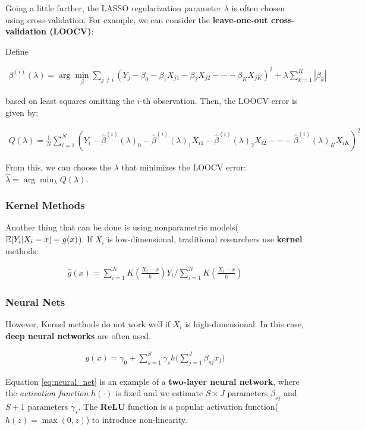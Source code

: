 Going a little further, the LASSO regularization parameter $\lambda$ is often chosen using cross-validation. For example, we can consider the \textbf{leave-one-out cross-validation (LOOCV)}:

Define 

\begin{align}
    \beta^{(i)}(\lambda) = \arg\min_{\beta} \sum_{j\neq i} (Y_j - \beta_0 - \beta_1 X_{j1} - \beta_2 X_{j2} - \cdots - \beta_K X_{jK})^2 + \lambda \sum_{k=1}^K |\beta_k|
\end{align}

based on least squares omitting the $i$-th observation. Then, the LOOCV error is given by:

\begin{align}
    Q(\lambda) = \frac{1}{N} \sum_{i=1}^N (Y_i - \hat{\beta}^{(i)}(\lambda)_0 - \hat{\beta}^{(i)}(\lambda)_1 X_{i1} - \hat{\beta}^{(i)}(\lambda)_2 X_{i2} - \cdots - \hat{\beta}^{(i)}(\lambda)_K X_{iK})^2
\end{align}

From this, we can choose the $\lambda$ that minimizes the LOOCV error: $\hat{\lambda} = \arg\min_\lambda Q(\lambda)$.

\subsubsection{Kernel Methods}

Another thing that can be done is using nonparametric models(${\mathbb{E}}[Y_i|X_i=x] = g(x)$). If $X_i$ is low-dimensional, traditional researchers use \textbf{kernel} methods:

\begin{align}
    \hat{g}(x) = \sum_{i=1}^N K(\frac{X_i - x}{h}) Y_i \Big/ \sum_{i=1}^N K(\frac{X_i - x}{h})
\end{align}

\subsubsection{Neural Nets}

However, Kernel methods do not work well if $X_i$ is high-dimensional.
In this case, \textbf{deep neural networks} are often used.

\begin{align}
    g(x) = \gamma_0 + \sum_{s=1}^S \gamma_s h\biggl(\sum_{j=1}^J \beta_{sj} x_j\biggr)\label{eq:neural_net}
\end{align}

Equation \ref{eq:neural_net} is an example of a \textbf{two-layer neural network}, where the \textit{activation function} $h(\cdot)$ is fixed and we estimate $S\times J$ parameters $\beta_{sj}$ and $S+1$ parameters $\gamma_s$.
The \textbf{ReLU} function is a popular activation function($h(z) = \max(0, z)$) to introduce non-linearity.

